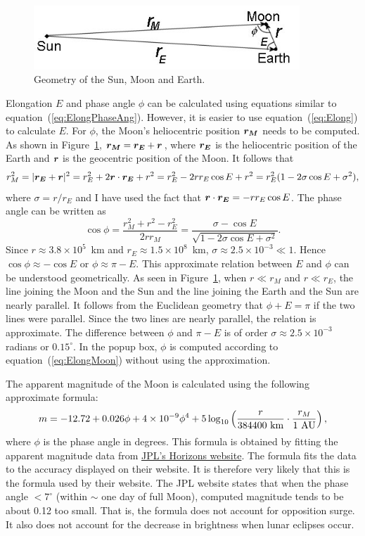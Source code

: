 \documentclass[12pt]{article}
\newcommand \beq {\begin{equation}}
\newcommand \eeq {\end{equation}}
\newcommand{\ve}[1]{\mbox{\boldmath $#1$}}
\begin{document}
\begin{figure}[h]
\begin{center}
\includegraphics[width=10cm]{sunEarthMoon.jpg}
\end{center}
\caption{Geometry of the Sun, Moon and Earth.}
\label{fig:SunMoonEarth}
\end{figure}

Elongation $E$ and phase angle $\phi$ can be calculated using equations similar to 
equation~(\ref{eq:ElongPhaseAng}). However, it is easier to use 
equation~(\ref{eq:Elong}) to calculate $E$. For $\phi$, 
the Moon's heliocentric position $\ve{r_M}$ needs to be computed. As shown in 
Figure~\ref{fig:SunMoonEarth}, $\ve{r_M}=\ve{r_E}+\ve{r}$, where 
$\ve{r_E}$ is the heliocentric 
position of the Earth and $\ve{r}$ is the geocentric position of the Moon. 
It follows that 
\beq
  r_M^2 = |\ve{r_E}+\ve{r}|^2 = r_E^2 + 2\ve{r}\cdot \ve{r_E} + r^2 = 
r_E^2 - 2 r r_E \cos E+r^2 = r_E^2(1-2\sigma \cos E + \sigma^2) ,
\eeq
where $\sigma=r/r_E$ and I have used the fact that 
$\ve{r}\cdot \ve{r_E}=-r r_E \cos E$. The phase angle can be written as 
\beq
  \cos \phi = \frac{r_M^2+r^2-r_E^2}{2rr_M} = \frac{\sigma - \cos E}
{\sqrt{1-2\sigma\cos E + \sigma^2}} .
\label{eq:ElongMoon}
\eeq
Since $r \approx 3.8\times 10^{5}$~km and $r_E\approx 1.5\times 10^8$~km, 
$\sigma \approx 2.5\times 10^{-3} \ll 1$. Hence $\cos \phi \approx -\cos E$ or 
$\phi \approx \pi - E$. This approximate relation between $E$ and $\phi$ can 
be understood geometrically. As seen in Figure~\ref{fig:SunMoonEarth}, when 
$r \ll r_M$ and $r \ll r_E$, the line joining the Moon and the Sun and the 
line joining the Earth and the Sun are nearly parallel. It follows from the 
Euclidean geometry that $\phi + E = \pi$ if the two lines were parallel. Since 
the two lines are nearly parallel, the relation is approximate.
The difference between $\phi$ and $\pi - E$ is of 
order $\sigma \approx 2.5\times 10^{-3}$ radians or $0.15^\circ$. 
In the popup box, $\phi$ is computed according to equation~(\ref{eq:ElongMoon}) 
without using the approximation. 

The apparent magnitude of the Moon is calculated using the following 
approximate formula:
\beq
  m = -12.72 + 0.026 \phi + 4\times 10^{-9} \phi^4 
+ 5\log_{10}\left( \frac{r}{384400~{\rm km}}\cdot \frac{r_M}{1~{\rm AU}}\right) ,
\eeq
where $\phi$ is the phase angle in degrees. 
This formula is obtained by fitting the apparent magnitude data from 
\href{https://ssd.jpl.nasa.gov/horizons.cgi}{JPL's Horizons website}. 
The formula fits the data to the accuracy displayed on their website. 
It is therefore very likely that this is the formula used by their website. 
The JPL website states that when the phase angle $< 7^\circ$ (within $\sim$ one 
day of full Moon), computed magnitude tends to be about 0.12 too small. That is, 
the formula does not account for opposition surge. It also does not account for 
the decrease in brightness when lunar eclipses occur.
\end{document}
